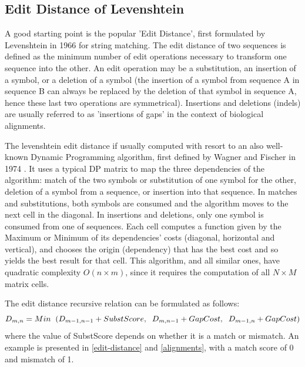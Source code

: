 \subsection{Edit Distance of Levenshtein}


A good starting point is the popular 'Edit Distance', first formulated by Levenshtein in 1966 \cite{levenshtein} for string matching. The edit distance of two sequences is defined as the minimum number of edit operations necessary to transform one sequence into the other. An edit operation may be a substitution, an insertion of a symbol, or a deletion of a symbol (the insertion of a symbol from sequence A in sequence B can always be replaced by the deletion of that symbol in sequence A, hence these last two operations are symmetrical). Insertions and deletions (indels) are usually referred to as 'insertions of gaps' in the context of biological alignments.

The levenshtein edit distance if usually computed with resort to an also well-known Dynamic Programming algorithm, first defined by Wagner and Fischer in 1974 \cite{wagner1974string}. It uses a typical \ac{DP} matrix to map the three dependencies of the algorithm: match of the two symbols or substitution of one symbol for the other, deletion of a symbol from a sequence, or insertion into that sequence. In matches and substitutions, both symbols are consumed and the algorithm moves to the next cell in the diagonal. In insertions and deletions, only one symbol is consumed from one of sequences. Each cell computes a function given by the Maximum or Minimum of its dependencies' costs (diagonal, horizontal and vertical), and chooses the origin (dependency) that has the best cost and so yields the best result for that cell. This algorithm, and all similar ones, have quadratic complexity $O(n  \times  m)$, since it requires the computation of all $N \times M$ matrix cells.

The edit distance recursive relation can be formulated as follows:
\hspace{1 pc} $$D_{m,n} = Min \hspace{0.2cm}(D_{m-1,n-1} + SubstScore, \hspace{0.2cm} D_{m,n-1} + GapCost, \hspace{0.2cm}  D_{m-1,n} + GapCost ) $$
where the value of SubstScore depends on whether it is a match or mismatch. An example is presented in \autoref{edit-distance} and \autoref{alignments}, with a match score of 0 and mismatch of 1.

